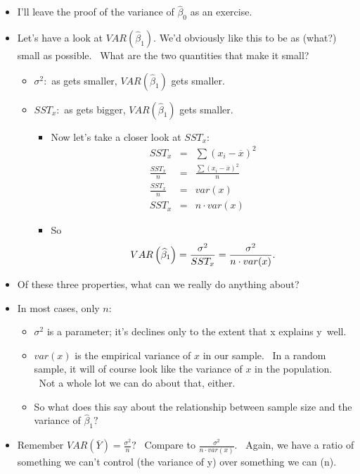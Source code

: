\documentclass[11pt]{article}
\begin{document}
\begin{itemize}
\item I'll leave the proof of the variance of $\widehat{\beta }_{0}$ as an
exercise.

\item Let's have a look at $VAR\left( \widehat{\beta }_{1}\right) .$ We'd
obviously like this to be as (what?) small as possible. \ What are the two
quantities that make it small?

\begin{itemize}
\item $\sigma ^{2}:$ as gets smaller, $VAR\left( \widehat{\beta }_{1}\right) 
$ gets smaller.

\item $SST_{x}:$ as gets bigger, $VAR\left( \widehat{\beta }_{1}\right) $
gets smaller.

\begin{itemize}
\item Now let's take a closer look at $SST_{x}:$%
\begin{eqnarray*}
SST_{x} &=&\sum \left( x_{i}-\overline{x}\right) ^{2} \\
\frac{SST_{x}}{n} &=&\frac{\sum \left( x_{i}-\overline{x}\right) ^{2}}{n} \\
\frac{SST_{x}}{n} &=&var(x) \\
SST_{x} &=&n\cdot var(x)
\end{eqnarray*}

\item So%
\begin{equation*}
VAR\left( \widehat{\beta }_{1}\right) =\frac{\sigma ^{2}}{SST_{x}}=\frac{%
\sigma ^{2}}{n\cdot var(x)}.
\end{equation*}
\end{itemize}
\end{itemize}

\item Of these three properties, what can we really do anything about?

\item In most cases, only $n$:

\begin{itemize}
\item $\sigma ^{2}$ is a parameter; it's declines only to the extent that x
explains y\ well.

\item $var(x)$ is the empirical variance of $x$ in our sample. \ In a random
sample, it will of course look like the variance of $x$ in the population. \
Not a whole lot we can do about that, either.

\item So what does this say about the relationship between sample size and
the variance of $\widehat{\beta }_{1}?$
\end{itemize}

\item Remember $VAR(\overline{Y})=\frac{\sigma ^{2}}{n}?$ \ Compare to $%
\frac{\sigma ^{2}}{n\cdot var(x)}.$ \ Again, we have a ratio of something we
can't control (the variance of y) over something we can (n).
\end{itemize}
\end{document}
